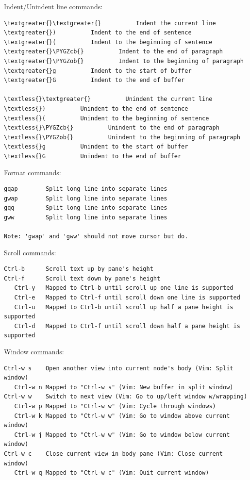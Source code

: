 \documentclass[a4paper,10pt,english]{sphinxmanual}
\def\PYGZob{\char`\{}
\def\PYGZcb{\char`\}}
\begin{document}
Indent/Unindent line commands:

\begin{Verbatim}[commandchars=\\\{\}]
\textgreater{}\textgreater{}          Indent the current line
\textgreater{})          Indent to the end of sentence
\textgreater{}(          Indent to the beginning of sentence
\textgreater{}\PYGZcb{}          Indent to the end of paragraph
\textgreater{}\PYGZob{}          Indent to the beginning of paragraph
\textgreater{}g          Indent to the start of buffer
\textgreater{}G          Indent to the end of buffer

\textless{}\textgreater{}          Unindent the current line
\textless{})          Unindent to the end of sentence
\textless{}(          Unindent to the beginning of sentence
\textless{}\PYGZcb{}          Unindent to the end of paragraph
\textless{}\PYGZob{}          Unindent to the beginning of paragraph
\textless{}g          Unindent to the start of buffer
\textless{}G          Unindent to the end of buffer
\end{Verbatim}

Format commands:

\begin{Verbatim}[commandchars=\\\{\}]
gqap        Split long line into separate lines
gwap        Split long line into separate lines
gqq         Split long line into separate lines
gww         Split long line into separate lines

Note: 'gwap' and 'gww' should not move cursor but do.
\end{Verbatim}

Scroll commands:

\begin{Verbatim}[commandchars=\\\{\}]
Ctrl-b      Scroll text up by pane's height
Ctrl-f      Scroll text down by pane's height
   Ctrl-y   Mapped to Ctrl-b until scroll up one line is supported
   Ctrl-e   Mapped to Ctrl-f until scroll down one line is supported
   Ctrl-u   Mapped to Ctrl-b until scroll up half a pane height is supported
   Ctrl-d   Mapped to Ctrl-f until scroll down half a pane height is supported
\end{Verbatim}

Window commands:

\begin{Verbatim}[commandchars=\\\{\}]
Ctrl-w s    Open another view into current node's body (Vim: Split window)
   Ctrl-w n Mapped to "Ctrl-w s" (Vim: New buffer in split window)
Ctrl-w w    Switch to next view (Vim: Go to up/left window w/wrapping)
   Ctrl-w p Mapped to "Ctrl-w w" (Vim: Cycle through windows)
   Ctrl-w k Mapped to "Ctrl-w w" (Vim: Go to window above current window)
   Ctrl-w j Mapped to "Ctrl-w w" (Vim: Go to window below current window)
Ctrl-w c    Close current view in body pane (Vim: Close current window)
   Ctrl-w q Mapped to "Ctrl-w c" (Vim: Quit current window)
\end{Verbatim}
\end{document}

